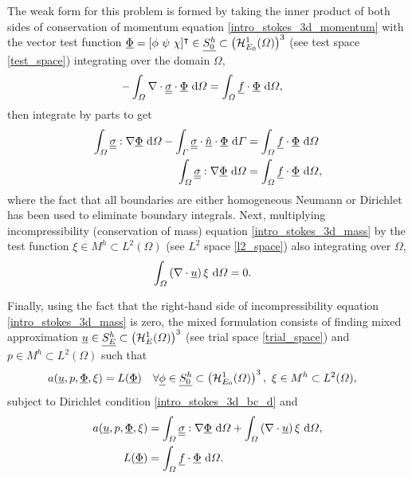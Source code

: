 The weak form for this problem is formed by taking the inner product of both sides of conservation of momentum equation \cref{intro_stokes_3d_momentum} with the vector test function $\underline{\Phi} = [\phi\ \psi\ \chi]^\intercal \in \underline{S_0^h} \subset \left( \mathcal{H}_{E_0}^1(\varOmega) \right)^3$ (see test space \cref{test_space}) integrating over the domain $\Omega$,
\begin{align*}
  -\int_{\varOmega} \nabla \cdot \underline{\underline{\sigma}} \cdot \underline{\Phi} \ \mathrm{d}\varOmega &= \int_{\varOmega} \underline{f} \cdot \underline{\Phi} \ \mathrm{d}\varOmega,
\end{align*}
then integrate by parts to get 
\begin{align*}
  \int_{\varOmega} \underline{\underline{\sigma}} : \nabla \underline{\Phi} \ \mathrm{d}\varOmega - \int_{\varGamma} \underline{\underline{\sigma}} \cdot \underline{\hat{n}} \cdot \underline{\Phi} \ \mathrm{d}\varGamma &= \int_{\varOmega} \underline{f} \cdot \underline{\Phi} \ \mathrm{d}\varOmega \\
  \int_{\varOmega} \underline{\underline{\sigma}} : \nabla \underline{\Phi} \ \mathrm{d}\varOmega &= \int_{\varOmega} \underline{f} \cdot \underline{\Phi} \ \mathrm{d}\varOmega,
\end{align*}
where the fact that all boundaries are either homogeneous Neumann or Dirichlet has been used to eliminate boundary integrals.  Next, multiplying incompressibility (conservation of mass) equation \cref{intro_stokes_3d_mass} by the test function $\xi \in M^h \subset L^2(\Omega)$ (see $L^2$ space \cref{l2_space}) also integrating over $\Omega$,
\begin{align*}
  \int_{\varOmega} \left( \nabla \cdot \underline{u} \right) \xi \ \mathrm{d}\varOmega &= 0.
\end{align*}

Finally, using the fact that the right-hand side of incompressibility equation \cref{intro_stokes_3d_mass} is zero, the mixed formulation  consists of finding mixed approximation $\underline{u} \in \underline{S_E^h} \subset \left( \mathcal{H}_E^1(\varOmega) \right)^3$ (see trial space \cref{trial_space}) and $p \in M^h \subset L^2(\Omega)$ such that
{\footnotesize
\begin{align}
  \label{intro_stokes_3d_mixed_problem}
  a(\underline{u},p,\underline{\Phi},\xi) &= L(\underline{\Phi}) && \forall \underline{\phi} \in \underline{S_0^h} \subset \left( \mathcal{H}_{E_0}^1(\varOmega) \right)^3,\ \xi \in M^h \subset L^2(\varOmega),
\end{align}}
subject to Dirichlet condition \cref{intro_stokes_3d_bc_d} and
\begin{align*}
  a(\underline{u},p,\underline{\Phi},\xi) &= \int_{\varOmega} \underline{\underline{\sigma}} : \nabla \underline{\Phi} \ \mathrm{d}\varOmega + \int_{\varOmega} \left( \nabla \cdot \underline{u} \right) \xi \ \mathrm{d}\varOmega, \\
  L(\underline{\Phi}) &= \int_{\varOmega} \underline{f} \cdot \underline{\Phi} \ \mathrm{d}\varOmega.
\end{align*}

